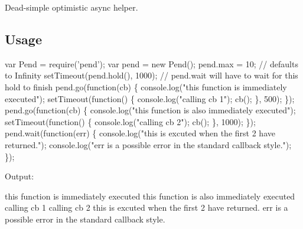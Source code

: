 Dead-\/simple optimistic async helper.

\subsection*{Usage}


\begin{DoxyCode}
var Pend = require('pend');
var pend = new Pend();
pend.max = 10; // defaults to Infinity
setTimeout(pend.hold(), 1000); // pend.wait will have to wait for this hold to finish
pend.go(function(cb) \{
  console.log("this function is immediately executed");
  setTimeout(function() \{
    console.log("calling cb 1");
    cb();
  \}, 500);
\});
pend.go(function(cb) \{
  console.log("this function is also immediately executed");
  setTimeout(function() \{
    console.log("calling cb 2");
    cb();
  \}, 1000);
\});
pend.wait(function(err) \{
  console.log("this is excuted when the first 2 have returned.");
  console.log("err is a possible error in the standard callback style.");
\});
\end{DoxyCode}


Output\+:


\begin{DoxyCode}
this function is immediately executed
this function is also immediately executed
calling cb 1
calling cb 2
this is excuted when the first 2 have returned.
err is a possible error in the standard callback style.
\end{DoxyCode}
 